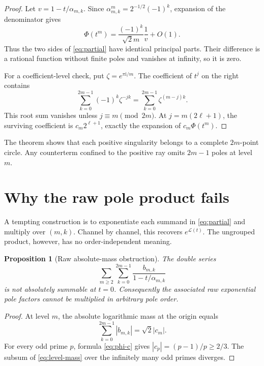 \documentclass[11pt]{article}
\newtheorem{proposition}[theorem]{Proposition}
\newcommand{\Lm}{\mathcal L}
\newcommand{\ii}{\mathrm i}
\begin{document}
\begin{proof}
Let $v=1-t/\alpha_{m,k}$.  Since
$\alpha_{m,k}^m=2^{-1/2}(-1)^k$, expansion of the denominator gives
\[
 \Phi(t^m)=\frac{(-1)^k}{\sqrt2m}\frac1v+O(1).
\]
Thus the two sides of \eqref{eq:partial} have identical principal parts.
Their difference is a rational function without finite poles and vanishes at
infinity, so it is zero.

For a coefficient-level check, put $\zeta=e^{\pi\ii/m}$.  The coefficient of
$t^j$ on the right contains
\[
 \sum_{k=0}^{2m-1}(-1)^k\zeta^{-jk}
 =\sum_{k=0}^{2m-1}\zeta^{(m-j)k}.
\]
This root sum vanishes unless $j\equiv m\pmod{2m}$.  At
$j=m(2\ell+1)$, the surviving coefficient is $c_m2^{\ell+1}$, exactly the
expansion of $c_m\Phi(t^m)$.
\end{proof}

The theorem shows that each positive singularity belongs to a complete
$2m$-point circle.  Any counterterm confined to the positive ray omits
$2m-1$ poles at level $m$.

\section{Why the raw pole product fails}

A tempting construction is to exponentiate each summand in
\eqref{eq:partial} and multiply over $(m,k)$.  Channel by channel, this
recovers $e^{\Lm(t)}$.  The ungrouped product, however, has no
order-independent meaning.

\begin{proposition}[Raw absolute-mass obstruction]\label{prop:raw}
The double series
\begin{equation}\label{eq:raw-series}
 \sum_{m\ge2}\sum_{k=0}^{2m-1}
 \frac{b_{m,k}}{1-t/\alpha_{m,k}}
\end{equation}
is not absolutely summable at $t=0$.  Consequently the associated raw
exponential pole factors cannot be multiplied in arbitrary pole order.
\end{proposition}

\begin{proof}
At level $m$, the absolute logarithmic mass at the origin equals
\begin{equation}\label{eq:level-mass}
 \sum_{k=0}^{2m-1}|b_{m,k}|=\sqrt2|c_m|.
\end{equation}
For every odd prime $p$, formula \eqref{eq:phi-c} gives
$|c_p|=(p-1)/p\ge2/3$.  The subsum of \eqref{eq:level-mass} over the
infinitely many odd primes diverges.
\end{proof}
\end{document}
